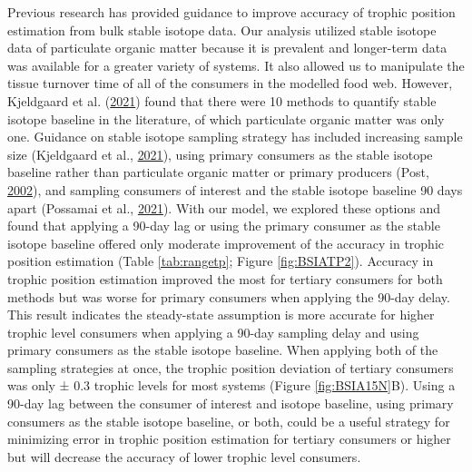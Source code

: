 \documentclass [11pt, proquest] {uwthesis}[2015/03/03]
\begin{document}
Previous research has provided guidance to improve accuracy of trophic
position estimation from bulk stable isotope data. Our analysis utilized
stable isotope data of particulate organic matter because it is
prevalent and longer-term data was available for a greater variety of
systems. It also allowed us to manipulate the tissue turnover time of
all of the consumers in the modelled food web. However, Kjeldgaard et
al. (\protect\hyperlink{ref-Kjeldgaard2021}{2021}) found that there were
10 methods to quantify stable isotope baseline in the literature, of
which particulate organic matter was only one. Guidance on stable
isotope sampling strategy has included increasing sample size
(Kjeldgaard et al., \protect\hyperlink{ref-Kjeldgaard2021}{2021}), using
primary consumers as the stable isotope baseline rather than particulate
organic matter or primary producers (Post,
\protect\hyperlink{ref-Post2002}{2002}), and sampling consumers of
interest and the stable isotope baseline 90 days apart (Possamai et al.,
\protect\hyperlink{ref-Possamai2021}{2021}). With our model, we explored
these options and found that applying a 90-day lag or using the primary
consumer as the stable isotope baseline offered only moderate
improvement of the accuracy in trophic position estimation (Table
\ref{tab:rangetp}; Figure \ref{fig:BSIATP2}). Accuracy in trophic
position estimation improved the most for tertiary consumers for both
methods but was worse for primary consumers when applying the 90-day
delay. This result indicates the steady-state assumption is more
accurate for higher trophic level consumers when applying a 90-day
sampling delay and using primary consumers as the stable isotope
baseline. When applying both of the sampling strategies at once, the
trophic position deviation of tertiary consumers was only ± 0.3 trophic
levels for most systems (Figure \ref{fig:BSIA15N}B). Using a 90-day lag
between the consumer of interest and isotope baseline, using primary
consumers as the stable isotope baseline, or both, could be a useful
strategy for minimizing error in trophic position estimation for
tertiary consumers or higher but will decrease the accuracy of lower
trophic level consumers.
\end{document}
